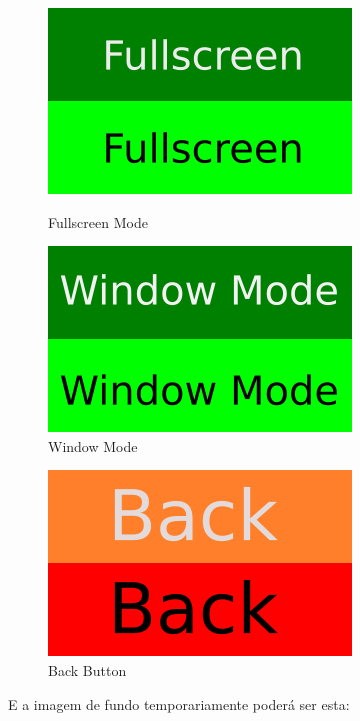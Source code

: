 \documentclass[12pt]{article}
\begin{document}
\begin{figure}[!htb]
	\centering
	\begin{minipage}{0.5\textwidth}
		\centering
		\includegraphics[scale=0.6]{menu_buttom/fullscreen_mode_button.png}
		\caption{Fullscreen Mode}
		\label{fullscreen_mode}
	\end{minipage}%
	\begin{minipage}{0.5\textwidth}
		\centering
		\includegraphics[scale=0.6]{menu_buttom/window_mode_button.png}
		\caption{Window Mode}
		\label{window_mode}
	\end{minipage}
\end{figure}

\begin{figure}[!htb]
    \centering
    \includegraphics[scale=0.6]{menu_buttom/back_button.png}
    \caption{Back Button}
    \label{fig:back_button}
\end{figure}

\newpage
E a imagem de fundo temporariamente poderá ser esta:
\end{document}
